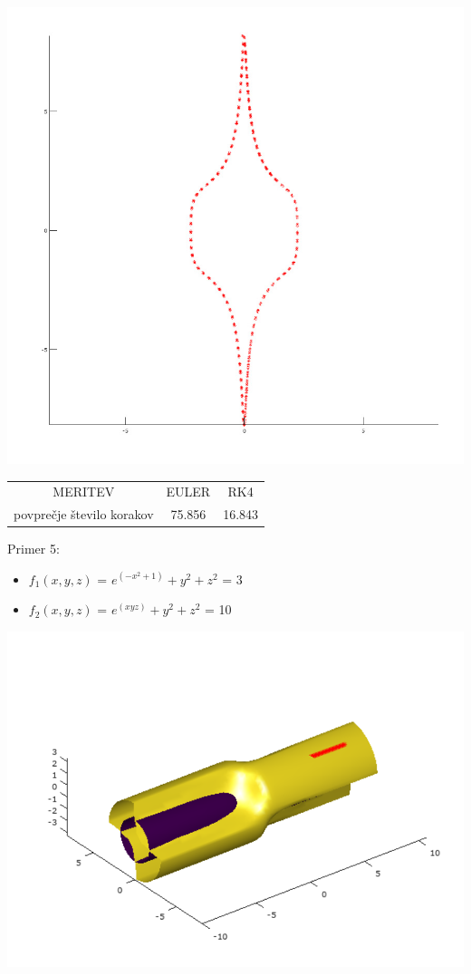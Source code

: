 \documentclass[]{article}
\begin{document}
	\includegraphics[scale=0.3]{primer4_3}
	\begin{center}
	\begin{tabular}{ |c|c|c| } 
 		\hline
 			MERITEV & EULER & RK4 \\ 
			povpre\v{c}je \v{s}tevilo korakov & 75.856 & 16.843 \\ 
 		\hline
 	\end{tabular}
	\end{center}
	Primer 5:
	\begin{itemize}  
		\item $f_{1}(x,y,z)$ = $e^{(-x^{2}+1)}+y^{2}+z^{2}$ = 3
		\item $f_{2}(x,y,z)$ = $e^{(xyz)}+y^{2}+z^{2}$ = 10
	\end{itemize}
	\includegraphics[scale=0.3]{primer5_1}
\end{document}
